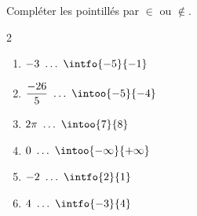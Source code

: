 \begin{exo}{}
	Compléter les pointillés par $\in$ ou $\notin$.
	\vspace*{-2mm}\begin{multicols}{2}
	\begin{enumerate}[itemsep=2mm]
		\item $-3 \ \dots \ \intfo{-5}{-1}$
		\item $\dfrac{-26}{5} \ \dots \ \intoo{-5}{-4}$
		\item $2\pi \ \dots \ \intoo{7}{8}$
		\item $0 \ \dots \ \intoo{-\infty}{+\infty}$
		\item $-2 \ \dots \ \intfo{2}{1}$
		\item $4 \ \dots \ \intfo{-3}{4}$
	\end{enumerate}
	\end{multicols}\vspace*{-2mm}
\end{exo}
